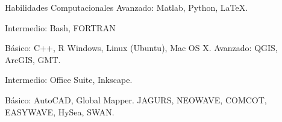 
\begin{rubric}{Habilidades Computacionales}
	Avanzado: Matlab, Python, \LaTeX. \par
	Intermedio: Bash, FORTRAN \par
	Básico: C++, R
\entry*[Plataformas OS]
	Windows, Linux (Ubuntu), Mac OS X.
\entry*[Herramientas]
	Avanzado: QGIS, ArcGIS, GMT. \par
	Intermedio: Office Suite, Inkscape. \par
	Básico: AutoCAD, Global Mapper.
	JAGURS, NEOWAVE, COMCOT, EASYWAVE, HySea, SWAN.
\end{rubric}
